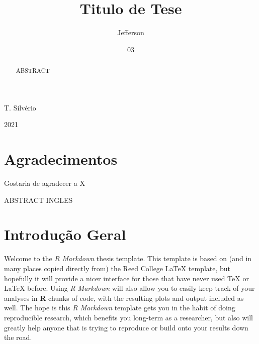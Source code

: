 \documentclass[msc,numbers,hidelinks]{coppe}
\begin{document}
  \title{Titulo de Tese}
    \author{Jefferson}{T. Silvério}
  

  \date{03}{2021}
    
  \maketitle

  \frontmatter
  
  \dedication{A alguém cujo valor é digno desta dedicatória.}
    \chapter*{Agradecimentos}
  Gostaria de agradecer a X
  
  \begin{abstract}
  ABSTRACT
  \end{abstract}
  \pagebreak
  \begin{foreignabstract}
  ABSTRACT INGLES
  \end{foreignabstract}
  \tableofcontents
  
    \listoffigures
  
    \listoftables
  
  \printlosymbols
  \printloabbreviations

  \mainmatter
  \hypertarget{introduuxe7uxe3o-geral}{%
  \chapter*{Introdução Geral}\label{introduuxe7uxe3o-geral}}

  Welcome to the \emph{R Markdown} thesis template. This template is based on (and in many places copied directly from) the Reed College LaTeX template, but hopefully it will provide a nicer interface for those that have never used TeX or LaTeX before. Using \emph{R Markdown} will also allow you to easily keep track of your analyses in \textbf{R} chunks of code, with the resulting plots and output included as well. The hope is this \emph{R Markdown} template gets you in the habit of doing reproducible research, which benefits you long-term as a researcher, but also will greatly help anyone that is trying to reproduce or build onto your results down the road.
\end{document}
